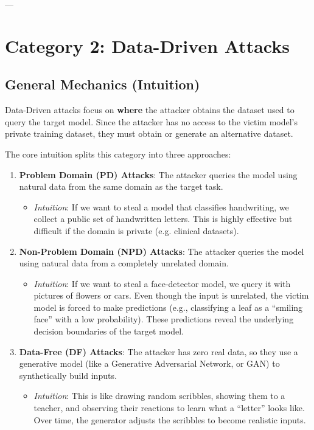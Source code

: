 \documentclass{article}
\begin{document}
---

\section{Category 2: Data-Driven Attacks}

\subsection{General Mechanics (Intuition)}
Data-Driven attacks focus on \textbf{where} the attacker obtains the dataset used to query the target model. Since the attacker has no access to the victim model's private training dataset, they must obtain or generate an alternative dataset.

The core intuition splits this category into three approaches:
\begin{enumerate}
    \item \textbf{Problem Domain (PD) Attacks}: The attacker queries the model using natural data from the same domain as the target task.
    \begin{itemize}
        \item \textit{Intuition}: If we want to steal a model that classifies handwriting, we collect a public set of handwritten letters. This is highly effective but difficult if the domain is private (e.g. clinical datasets).
    \end{itemize}
    \item \textbf{Non-Problem Domain (NPD) Attacks}: The attacker queries the model using natural data from a completely unrelated domain.
    \begin{itemize}
        \item \textit{Intuition}: If we want to steal a face-detector model, we query it with pictures of flowers or cars. Even though the input is unrelated, the victim model is forced to make predictions (e.g., classifying a leaf as a ``smiling face'' with a low probability). These predictions reveal the underlying decision boundaries of the target model.
    \end{itemize}
    \item \textbf{Data-Free (DF) Attacks}: The attacker has zero real data, so they use a generative model (like a Generative Adversarial Network, or GAN) to synthetically build inputs.
    \begin{itemize}
        \item \textit{Intuition}: This is like drawing random scribbles, showing them to a teacher, and observing their reactions to learn what a ``letter'' looks like. Over time, the generator adjusts the scribbles to become realistic inputs.
    \end{itemize}
\end{enumerate}
\end{document}
